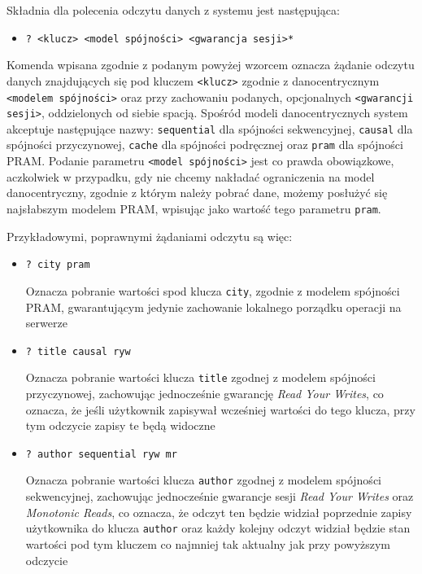 Składnia dla polecenia odczytu danych z systemu jest następująca:

\begin{itemize}[label={}]
    \item \texttt{? <klucz> <model spójności> <gwarancja sesji>*}
\end{itemize}

Komenda wpisana zgodnie z podanym powyżej wzorcem oznacza żądanie odczytu danych znajdujących się pod kluczem \texttt{<klucz>} zgodnie z danocentrycznym \texttt{<modelem~spójności>} oraz przy zachowaniu podanych, opcjonalnych \texttt{<gwarancji sesji>}, oddzielonych od siebie spacją. Spośród modeli danocentrycznych system akceptuje następujące nazwy: \texttt{sequential} dla spójności sekwencyjnej, \texttt{causal} dla spójności przyczynowej, \texttt{cache} dla spójności podręcznej oraz \texttt{pram} dla spójności PRAM. Podanie parametru \texttt{<model spójności>} jest co prawda obowiązkowe, aczkolwiek w przypadku, gdy nie chcemy nakładać ograniczenia na model danocentryczny, zgodnie z którym należy pobrać dane, możemy posłużyć się najsłabszym modelem PRAM, wpisując jako wartość tego parametru \texttt{pram}.

Przykładowymi, poprawnymi żądaniami odczytu są więc:

\begin{itemize}[label={}]
    \item \texttt{? city pram}
    
    Oznacza pobranie wartości spod klucza \texttt{city}, zgodnie z modelem spójności PRAM, gwarantującym jedynie zachowanie lokalnego porządku operacji na serwerze
    
    \item \texttt{? title causal ryw}
    
    Oznacza pobranie wartości klucza \texttt{title} zgodnej z modelem spójności przyczynowej, zachowując jednocześnie gwarancję \textit{Read Your Writes}, co oznacza, że jeśli użytkownik zapisywał wcześniej wartości do tego klucza, przy tym odczycie zapisy te będą widoczne
    
    \item \texttt{? author sequential ryw mr}
    
    Oznacza pobranie wartości klucza \texttt{author} zgodnej z modelem spójności sekwencyjnej, zachowując jednocześnie gwarancje sesji \textit{Read Your Writes} oraz \textit{Monotonic Reads}, co oznacza, że odczyt ten będzie widział poprzednie zapisy użytkownika do klucza \texttt{author} oraz każdy kolejny odczyt widział będzie stan wartości pod tym kluczem co najmniej tak aktualny jak przy powyższym odczycie
\end{itemize}

